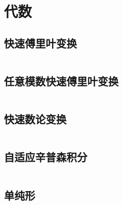 \chapter{代数}
\section{快速傅里叶变换}
\inputminted{cpp}{\source/algebra/fast-fourier-transform.cpp}
\section{任意模数快速傅里叶变换}
\inputminted{cpp}{\source/algebra/fft-mod-any.cpp}
\section{快速数论变换}
\inputminted{cpp}{\source/algebra/number-theory-transform.cpp}
\section{自适应辛普森积分}
\inputminted{cpp}{\source/algebra/adaptive-simpsons-method.cpp}
\section{单纯形}
\inputminted{cpp}{\source/algebra/simplex.cpp}
